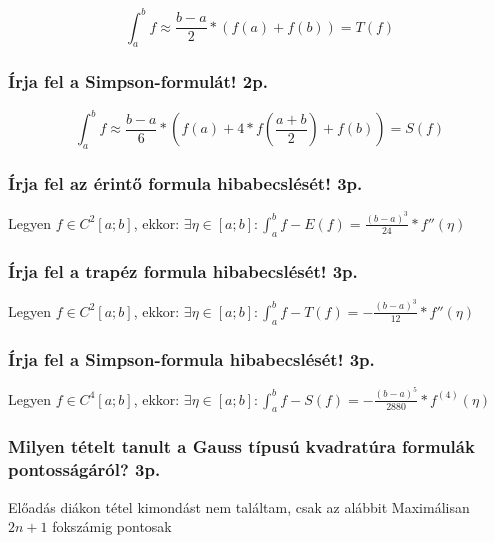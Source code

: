 \documentclass[12pt,a4paper]{article}
\begin{document}
$$\int_{a}^{b} f \approx \frac{b-a}{2} * (f(a) + f(b)) = T(f)$$

\subsubsection{Írja fel a Simpson-formulát! 2p.}

$$\int_{a}^{b} f \approx \frac{b-a}{6} * (f(a) + 4*f(\frac{a+b}{2}) + f(b)) = S(f)$$

\subsubsection{Írja fel az érintő formula hibabecslését! 3p.}

Legyen $f \in C^2[a;b]$, ekkor: $\exists \eta \in [a;b]:
\int_{a}^{b}f-E(f) = \frac{(b-a)^3}{24} * f''(\eta)$

\subsubsection{Írja fel a trapéz formula hibabecslését! 3p.}

Legyen $f \in C^2[a;b]$, ekkor: $\exists \eta \in [a;b]:
\int_{a}^{b}f-T(f) = -\frac{(b-a)^3}{12} * f''(\eta)$

\subsubsection{Írja fel a Simpson-formula hibabecslését! 3p.}

Legyen $f \in C^4[a;b]$, ekkor: $\exists \eta \in [a;b]:
\int_{a}^{b}f-S(f) = -\frac{(b-a)^5}{2880} * f^{(4)}(\eta)$

\pagebreak

\subsubsection{Milyen tételt tanult a Gauss típusú kvadratúra formulák pontosságáról? 3p.}

\begin{outline}
	\1 Előadás diákon tétel kimondást nem találtam, csak az alábbit
	\1 Maximálisan $2n+1$ fokszámig pontosak
\end{outline}
\end{document}
